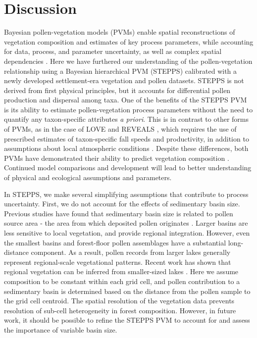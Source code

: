 \documentclass[12pt]{article}
\begin{document}
\section{Discussion}

Bayesian pollen-vegetation models (PVMs) enable spatial
reconstructions of vegetation composition and estimates of key process
parameters, while accounting for data, process, and parameter
uncertainty, as well as complex spatial dependencies
\citep{paciorek2009mapping}.  Here we have furthered our understanding
of the pollen-vegetation relationship using a Bayesian hierarchical
PVM (STEPPS) calibrated with a newly developed settlement-era
vegetation and pollen datasets. STEPPS is not derived from first
physical principles, but it accounts for differential pollen
production and dispersal among taxa. One of the benefits of the STEPPS
PVM is its ability to estimate pollen-vegetation process parameters
without the need to quantify any taxon-specific attributes \textit{a
  priori}. This is in contrast to other forms of PVMs, as in the case
of LOVE and REVEALS \citep{sugita2007theory1, sugita2007theory2},
which requires the use of prescribed estimates of taxon-specific fall
speeds and productivity, in addition to assumptions about local
atmospheric conditions \citep{jackson1999pollen}. Despite these
differences, both PVMs have demonstrated their ability to predict
vegetation composition
\citep{soepboer2010regional,wang2011reassessment,
  overballe2013quantitative}. Continued model comparisons and
development will lead to better understanding of physical and
ecological assumptions and parameters.

In STEPPS, we make several simplifying assumptions that contribute to
process uncertainty. First, we do not account for the effects of
sedimentary basin size. Previous studies have found that sedimentary
basin size is related to pollen source area - the area from which
deposited pollen originates \citep{jacobson1981selection,
  prentice1985pollen, sugita1994pollen}. Larger basins are less
sensitive to local vegetation, and provide regional
integration. However, even the smallest basins \citep{jackson1990} and
forest-floor pollen assemblages \citep{jackson1998quantitative,
  calcote1995pollen} have a substantial long-distance component. As a
result, pollen records from larger lakes generally represent
regional-scale vegetational patterns. Recent work has shown that
regional vegetation can be inferred from smaller-sized lakes
\citep{trondmanpollen}. Here we assume composition to be constant
within each grid cell, and pollen contribution to a sedimentary basin
is determined based on the distance from the pollen sample to the
grid cell centroid. The spatial resolution of the vegetation data
prevents resolution of sub-cell heterogeneity in forest
composition. However, in future work, it should be possible to refine
the STEPPS PVM to account for and assess the importance of variable
basin size.
\end{document}

